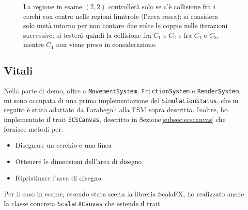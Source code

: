 \begin{figure}[H]
    \centering
    \caption{La regione in esame $(2, 2)$ controllerà solo se c'è collisione fra i cerchi con centro nelle regioni
    limitrofe (l'area rossa);
    si considera solo metà intorno per non contare due volte le coppie nelle iterazioni successive;
    si testerà quindi la collisione fra $C_1$ e $C_2$ e fra $C_1$ e $C_3$, mentre $C_4$ non viene preso in
    considerazione.}
    \label{fig:space-partition}
\end{figure}

\subsection{Vitali}\label{subsec:demo-vitali}
Nella parte di demo, oltre a \texttt{MovementSystem}, \texttt{FrictionSystem} e \texttt{RenderSystem},
mi sono occupata di una prima implementazione del \texttt{SimulationStatus}, che in seguito è stato adattato da
Farabegoli alla FSM sopra descritta.
Inoltre, ho implementato il trait \texttt{ECSCanvas}, descritto in Sezione\ref{subsec:ecscanvas} che fornisce metodi per:
\begin{itemize}
    \item Disegnare un cerchio e una linea
    \item Ottenere le dimensioni dell'area di disegno
    \item Ripristinare l'area di disegno
\end{itemize}
Per il caso in esame, essendo stata scelta la libreria ScalaFX, ho realizzato anche la classe concreta
\texttt{ScalaFXCanvas} che estende il trait.
